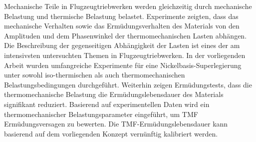 \noindent
Mechanische Teile in Flugzeugtriebwerken werden gleichzeitig durch mechanische Belastung und thermische Belastung belastet. Experimente zeigten, dass das mechanische Verhalten sowie das Ermüdungsverhalten des Materials von den Amplituden und dem Phasenwinkel der thermomechanischen Lasten abhängen. Die Beschreibung der gegenseitigen Abhängigkeit der Lasten ist eines der am intensivsten untersuchten Themen in Flugzeugtriebwerken. In der vorliegenden Arbeit wurden umfangreiche Experimente für eine Nickelbasis-Superlegierung unter sowohl iso-thermischen als auch thermomechanischen Belastungsbedingungen durchgeführt. Weiterhin zeigen Ermüdungstests, dass die thermomechanische Belastung die Ermüdungslebensdauer des Materials signifikant reduziert. Basierend auf experimentellen Daten wird ein thermomechanischer Belastungsparameter eingeführt, um TMF Ermüdungsversagen zu bewerten. Die TMF-Ermüdungslebensdauer kann basierend auf dem vorliegenden Konzept vernünftig kalibriert werden.